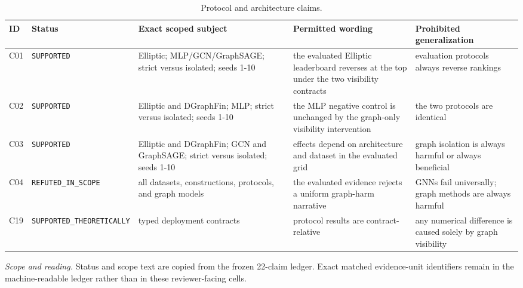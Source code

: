\begin{table}[tbp]
\centering
\footnotesize
\setlength{\tabcolsep}{3.2pt}
\renewcommand{\arraystretch}{1.12}
\caption{Protocol and architecture claims.}
\label{tab:s-claims-protocol}
\begin{tabularx}{\textwidth}{@{}l >{\raggedright\arraybackslash}p{} Y Y Y@{}}
\toprule
\textbf{ID} & \textbf{Status} & \textbf{Exact scoped subject} & \textbf{Permitted wording} & \textbf{Prohibited generalization} \\
\midrule
C01 & \texttt{SUPPORTED} & Elliptic; MLP/GCN/GraphSAGE; strict versus isolated; seeds 1-10 & the evaluated Elliptic leaderboard reverses at the top under the two visibility contracts & evaluation protocols always reverse rankings \\
C02 & \texttt{SUPPORTED} & Elliptic and DGraphFin; MLP; strict versus isolated; seeds 1-10 & the MLP negative control is unchanged by the graph-only visibility intervention & the two protocols are identical \\
C03 & \texttt{SUPPORTED} & Elliptic and DGraphFin; GCN and GraphSAGE; strict versus isolated; seeds 1-10 & effects depend on architecture and dataset in the evaluated grid & graph isolation is always harmful or always beneficial \\
C04 & \texttt{REFUTED\_\allowbreak{}IN\_\allowbreak{}SCOPE} & all datasets, constructions, protocols, and graph models & the evaluated evidence rejects a uniform graph-harm narrative & GNNs fail universally; graph methods are always harmful \\
C19 & \texttt{SUPPORTED\_\allowbreak{}THEORETICALLY} & typed deployment contracts & protocol results are contract-relative & any numerical difference is caused solely by graph visibility \\
\bottomrule
\end{tabularx}
\vspace{2pt}
\begin{minipage}{\textwidth}\footnotesize\emph{Scope and reading.} Status and scope text are copied from the frozen 22-claim ledger. Exact matched evidence-unit identifiers remain in the machine-readable ledger rather than in these reviewer-facing cells.\end{minipage}
\end{table}

